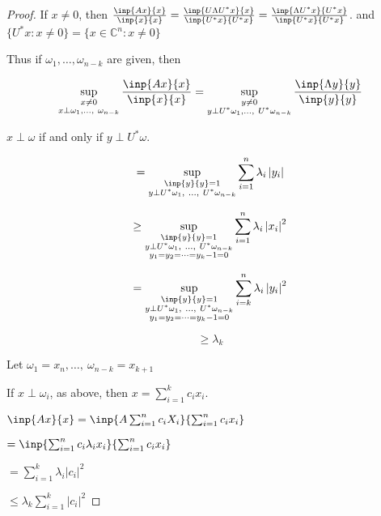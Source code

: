 \documentclass[twofold]{article}
\newcommand*\adj[1]{#1^*}
\newcommand*\abs[1]{\left \vert #1 \right\vert}
\theoremstyle{plain}
\theoremstyle{definition}
\begin{document}
\begin{proof} If \(x \neq 0\), then \(\frac{\inp{Ax}{x}}{\inp{x}{x}} = \frac{\inp{U \Lambda \adj{U} x}{x}}{\inp{\adj{U} x}{ \adj{U} x}} \\
 = \frac{\inp{\Lambda \adj{U} x}{ \adj{U} x}}{\inp{\adj{U}x}{\adj{U}x}}\). and \( \{ \adj{U} x : x \neq 0\}  = \{ x \in \mathbb{C}^n : x \neq 0 \}\) 



Thus if \(\omega_1, \ldots , \omega_{n-k}\) are given, then 

\[ \sup_{\substack{x \neq 0 \\ x \perp \omega_1, \ldots, \ \omega_{n-k}}} \frac{\inp{Ax}{x}}{\inp{x}{x}} = \sup_{\substack{y \neq 0 \\ y \perp \adj{U}\omega_1, \ldots ,\ \adj{U} \omega_{n-k}}} \frac{\inp{\Lambda y}{y}}{\inp{y}{y}}\]

\(x \perp \omega\) if and only if \(y \perp \adj{U} \omega\). 

\[ = \sup_{\substack{\inp{y}{y} = 1 \\ y \perp \adj{U} \omega_1, \ \ldots , \ \adj{U}\omega_{n-k}}} \sum_{i = 1}^n \lambda_i \abs{y_i}\]

\[ \ge \sup_{\substack{\inp{y}{y} = 1 \\ y \perp \adj{U} \omega_1, \ \ldots , \ \adj{U}\omega_{n-k} \\ y_1 = y_2 = \cdots = y_k-1 = 0 }} \sum_{i = 1}^n \lambda_i \abs{x_i}^2\]

\[ = \sup_{\substack{\inp{y}{y} = 1 \\ y \perp \adj{U} \omega_1, \ \ldots , \ \adj{U}\omega_{n-k} \\ y_1 = y_2 = \cdots = y_k-1 = 0 }} \sum_{i = k}^n \lambda_i \abs{y_i}^2\]

\[ \ge \lambda_k \]


Let \(\omega_1 = x_n , \ldots , \ \omega_{n-k} = x_{k + 1}\)

If \(x\perp \omega_i\), as above, then \(x = \sum_{i = 1} ^k c_i x_i\). 

\(\inp{Ax}{x} = \inp{A \sum_{i = 1} ^ n c_i X_i}{ \sum_{i = 1} ^n c_i x_i}\)

\( = \inp{\sum_{i = 1} ^n c_i \lambda_i x_i}{\sum_{i = 1} ^n c_i x_i}\)

\(= \sum_{i = 1} ^ k \lambda_i \abs{c_i}^2\) 

\( \le \lambda_k \sum_{i = 1} ^{k} \abs{c_i}^2\)


\end{proof}
\end{document}
